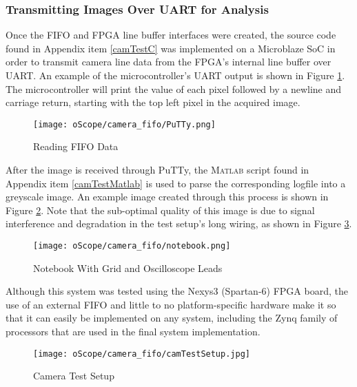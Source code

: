 \subsubsection{Transmitting Images Over UART for Analysis} \label{UARTimg}
Once the FIFO and FPGA line buffer interfaces were created, the source code found in Appendix item \ref{camTestC} was implemented on a Microblaze SoC in order to transmit camera line data from the FPGA's internal line buffer over UART. An example of the microcontroller's UART output is shown in Figure \ref{PuTTYfifoData}. The microcontroller will print the value of each pixel followed by a newline and carriage return, starting with the top left pixel in the acquired image. 
\begin{figure}[H]
	\centerline{\texttt{[image: oScope/camera\_fifo/PuTTy.png]}}
	\caption{Reading FIFO Data}
	\label{PuTTYfifoData}
\end{figure}
\par
After the image is received through PuTTy, the \textsc{Matlab} script found in Appendix item \ref{camTestMatlab} is used to parse the corresponding logfile into a greyscale image. An example image created through this process is shown in Figure \ref{notebookImage}. Note that the sub-optimal quality of this image is due to signal interference and degradation in the test setup's long wiring, as shown in Figure \ref{camTestSetup}. 
\begin{figure}[H]
	\centerline{\texttt{[image: oScope/camera\_fifo/notebook.png]}}
	\caption{Notebook With Grid and Oscilloscope Leads}
	\label{notebookImage}
\end{figure}
\par
Although this system was tested using the Nexys3 (Spartan-6) FPGA board, the use of an external FIFO and little to no platform-specific hardware make it so that it can easily be implemented on any system, including the Zynq family of processors that are used in the final system implementation.   
\begin{figure}[H]
	\centerline{\texttt{[image: oScope/camera\_fifo/camTestSetup.jpg]}}
	\caption{Camera Test Setup}
	\label{camTestSetup}
\end{figure}

